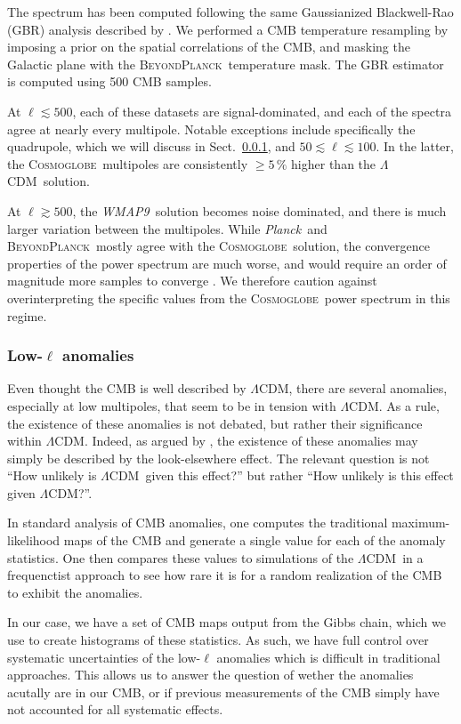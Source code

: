 \documentclass[twocolumn]{../../common/aa}
\def\WMAPnine{\emph{WMAP9}}
\def\planck{\emph{Planck}}
\def\LCDM{$\Lambda$CDM}
\newcommand{\bp}{\textsc{BeyondPlanck}}
\newcommand{\cosmoglobe}{\textsc{Cosmoglobe}}
\begin{document}
The spectrum has been computed following the same Gaussianized Blackwell-Rao (GBR) \citep{rudjord:2009} analysis described by \citep{bp11}. We performed a CMB temperature resampling by imposing a prior on the spatial correlations of the CMB, and masking the Galactic plane with the \bp\ temperature mask. The GBR estimator is computed using 500 CMB samples.

At $\ell\lesssim500$, each of these datasets are signal-dominated, and each of the spectra agree at nearly every multipole. Notable exceptions include specifically the quadrupole, which we will discuss in Sect.~\ref{sec:anomalies}, and $50\lesssim\ell\lesssim100$. In the latter, the \cosmoglobe\ multipoles are consistently $\geq5\,\%$ higher than the \LCDM\ solution.

At $\ell\gtrsim500$, the \WMAPnine\ solution becomes noise dominated, and there is much larger variation between the multipoles. While \planck\ and \bp\ mostly agree with the \cosmoglobe\ solution, the convergence properties of the power spectrum are much worse, and would require an order of magnitude more samples to converge \citep{bp11}. We therefore caution against overinterpreting the specific values from the \cosmoglobe\ power spectrum in this regime.


\subsubsection{Low-$\ell$ anomalies}
\label{sec:anomalies}

Even thought the CMB is well described by \LCDM, there are several anomalies, especially at low multipoles, that seem to be in tension with \LCDM. As a rule, the existence of these anomalies is not debated, but rather their significance within \LCDM. Indeed, as argued by \citet{bennett2010}, the existence of these anomalies may simply be described by the look-elsewhere effect. The relevant question is not ``How unlikely is \LCDM\ given this effect?'' but rather ``How unlikely is this effect given \LCDM?''.

In standard analysis of CMB anomalies, one computes the traditional maximum-likelihood maps of the CMB and generate a single value for each of the anomaly statistics. One then compares these values to simulations of the \LCDM\ in a frequenctist approach to see how rare it is for a random realization of the CMB to exhibit the anomalies.

In our case, we have a set of CMB maps output from the Gibbs chain, which we use to create histograms of these statistics. As such, we have full control over systematic uncertainties of the low-$\ell$ anomalies which is difficult in traditional approaches. This allows us to answer the question of wether the anomalies acutally are in our CMB, or if previous measurements of the CMB simply have not accounted for all systematic effects.
\end{document}
